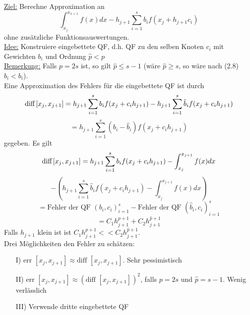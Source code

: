 \begin{nothing}
\underline{Ziel:} Berechne Approximation an 
$$\int_{x_j}^{x_{x+1}} f(x)dx - h_{j+1} \sum_{i=1}^s b_i f(x_j + h_{j+1} c_i)$$
ohne zusätzliche Funktionsauswertungen.\\
\underline{Idee:} Konstruiere eingebettete QF, d.h. QF zu den selben Knoten $c_i$ mit Gewichten $b_i$ und Ordnung $\hat{p} < p$ \\
\underline{Bemerkung:} Falls $p=2s$ ist, so gilt $\hat{p} \leq s-1$ (wäre $\hat{p} \geq s$, so wäre nach (2.8) $\hat{b}_i < b_i$).\\
Eine Approximation des Fehlers für die eingebettete QF ist durch 
$$\text{diff} \thinspace [x_j, x_{j+1}] = h_{j+1} \sum_{i=1}^s b_i f(x_j + c_i h_{j+1}) - h_{j+1} \sum_{i=1}^s \hat{b}_i f(x_j + c_i h_{j+1})$$
$$ = h_{j+1} \sum_{i=1}^s (b_i - \hat{b}_i) f(x_j+c_i h_{j+1})$$
gegeben. Es gilt
$$\text{diff} \thinspace [x_j, x_{j+1}] = h_{j+1} \sum_{i=1}^s b_i f(x_j + c_i h_{j+1}) - \int_{x_j}^{x_{j+1}} f(x)dx$$ 
$$- \left( h_{j+1} \sum_{i=1}^s \hat{b}_i f(x_j + c_i h_{j+1}) - \int_{x_j}^{x_{j+1}} f(x)dx \right)$$
$$ = \text{Fehler der QF } (b_i, c_i)_{i=1}^s - \text{Fehler der QF } (\hat{b}_i, c_i)_{i=1}^s$$
$$ = C_1 h_{j+1}^{p+1} + C_2h_{j+1}^{\hat{p}+1}$$
Falls $h_{j+1}$ klein ist ist $C_1 h_{j+1}^{p+1} << C_2h_{j+1}^{\hat{p}+1}$.\\
Drei Möglichkeiten den Fehler zu schätzen:
\begin{enumerate}
  \item[I)] $\text{err }[x_j, x_{j+1}] \approx \text{diff }[x_j, x_{j+1}]$. Sehr pessimistisch
  \item[II)] $\text{err }[x_j, x_{j+1}] \approx (\text{diff }[x_j, x_{j+1}])^2$, falls $p=2s$ und $\hat{p} = s-1$. Wenig verlässlich
  \item[III)] Verwende dritte eingebettete QF 
\end{enumerate}
\end{nothing}